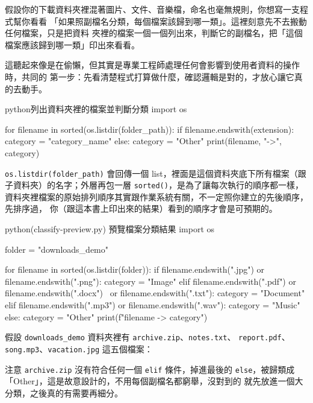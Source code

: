 假設你的下載資料夾裡混著圖片、文件、音樂檔，命名也毫無規則，你想寫一支程式幫你看看
「如果照副檔名分類，每個檔案該歸到哪一類」。這裡刻意先不去搬動任何檔案，只是把資料
夾裡的檔案一個一個列出來，判斷它的副檔名，把「這個檔案應該歸到哪一類」印出來看看。

這聽起來像是在偷懶，但其實是專業工程師處理任何會影響到使用者資料的操作時，共同的
第一步：先看清楚程式打算做什麼，確認邏輯是對的，才放心讓它真的去動手。

\begin{code}{python}{列出資料夾裡的檔案並判斷分類}
import os

for filename in sorted(os.listdir(folder_path)):
    if filename.endswith(extension):
        category = "category_name"
    else:
        category = "Other"
    print(filename, "->", category)
\end{code}

\texttt{os.listdir(folder\_path)} 會回傳一個 list，裡面是這個資料夾底下所有檔案（跟
子資料夾）的名字；外層再包一層 \texttt{sorted()}，是為了讓每次執行的順序都一樣，
資料夾裡檔案的原始排列順序其實跟作業系統有關，不一定照你建立的先後順序，先排序過，
你（跟這本書上印出來的結果）看到的順序才會是可預期的。

\begin{example}{python}{(classify-preview.py) 預覽檔案分類結果}
import os

folder = "downloads_demo"

for filename in sorted(os.listdir(folder)):
    if filename.endswith(".jpg") or filename.endswith(".png"):
        category = "Image"
    elif filename.endswith(".pdf") or filename.endswith(".docx") \
            or filename.endswith(".txt"):
        category = "Document"
    elif filename.endswith(".mp3") or filename.endswith(".wav"):
        category = "Music"
    else:
        category = "Other"
    print(f"{filename} -> {category}")
\end{example}

假設 \texttt{downloads\_demo} 資料夾裡有 \texttt{archive.zip}、\texttt{notes.txt}、
\texttt{report.pdf}、\texttt{song.mp3}、\texttt{vacation.jpg} 這五個檔案：


注意 \texttt{archive.zip} 沒有符合任何一個 \texttt{elif} 條件，掉進最後的
\texttt{else}，被歸類成「Other」，這是故意設計的，不用每個副檔名都窮舉，沒對到的
就先放進一個大分類，之後真的有需要再細分。

